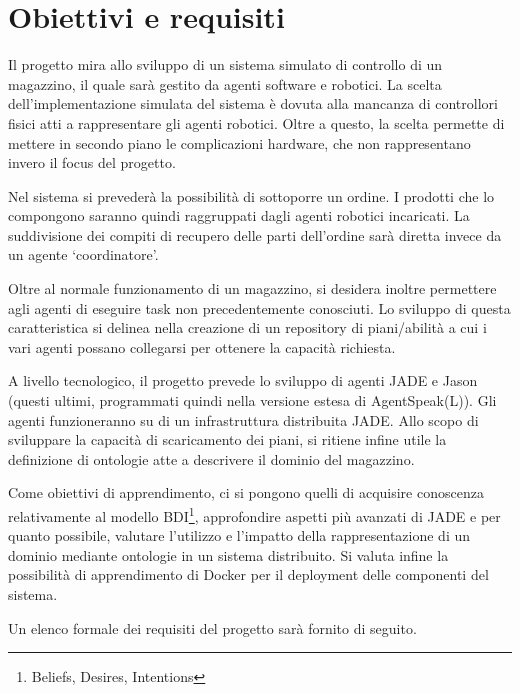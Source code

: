 \section{Obiettivi e requisiti}
%

Il progetto mira allo sviluppo di un sistema simulato di controllo di un magazzino, il quale sarà gestito da agenti software e robotici. La scelta dell’implementazione simulata del sistema è dovuta alla mancanza di controllori fisici atti a rappresentare gli agenti robotici. Oltre a questo, la scelta permette di mettere in secondo piano le complicazioni hardware, che non rappresentano invero il focus del progetto.

\parag
Nel sistema si prevederà la possibilità di sottoporre un ordine. I prodotti che lo compongono saranno quindi raggruppati dagli agenti robotici incaricati. La suddivisione dei compiti di recupero delle parti dell'ordine sarà diretta invece da un agente `coordinatore'.

Oltre al normale funzionamento di un magazzino, si desidera inoltre permettere agli agenti di eseguire task non precedentemente conosciuti. Lo sviluppo di questa caratteristica si delinea nella creazione di un repository di piani/abilità a cui i vari agenti possano collegarsi per ottenere la capacità richiesta.

\parag
A livello tecnologico, il progetto prevede lo sviluppo di agenti JADE\cite{ref:jade} e Jason\cite{ref:jason} (questi ultimi, programmati quindi nella versione estesa di AgentSpeak(L)). Gli agenti funzioneranno su di un infrastruttura distribuita JADE.
Allo scopo di sviluppare la capacità di scaricamento dei piani, si ritiene infine utile la definizione di ontologie atte a descrivere il dominio del magazzino.

\parag
Come obiettivi di apprendimento, ci si pongono quelli di acquisire conoscenza relativamente al modello BDI\footnote{Beliefs, Desires, Intentions}, approfondire aspetti più avanzati di JADE e per quanto
possibile, valutare l'utilizzo e l'impatto della rappresentazione di un dominio mediante ontologie in un sistema distribuito. Si valuta infine la possibilità di apprendimento di Docker\cite{ref:docker} per il deployment delle componenti del sistema.

\parag
Un elenco formale dei requisiti del progetto sarà fornito di seguito.

